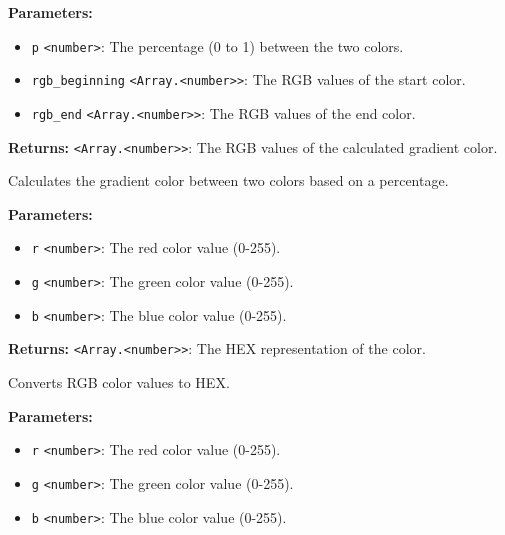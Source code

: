 \documentclass[12pt,a4paper]{article}
\begin{document}
\vspace{5mm}
\noindent {}


\noindent \textbf{Parameters:}
\begin{itemize}
  \item \texttt{p} \texttt{<number>}: The percentage (0 to 1) between the two colors.
  \item \texttt{rgb\_beginning} \texttt{<Array.<number>>}: The RGB values of the start color.
  \item \texttt{rgb\_end} \texttt{<Array.<number>>}: The RGB values of the end color.
\end{itemize}

\noindent \textbf{Returns:} \texttt{<Array.<number>>}: The RGB values of the calculated gradient color.

\noindent Calculates the gradient color between two colors based on a percentage.

\vspace{5mm}
\noindent {}


\noindent \textbf{Parameters:}
\begin{itemize}
  \item \texttt{r} \texttt{<number>}: The red color value (0-255).
  \item \texttt{g} \texttt{<number>}: The green color value (0-255).
  \item \texttt{b} \texttt{<number>}: The blue color value (0-255).
\end{itemize}

\noindent \textbf{Returns:} \texttt{<Array.<number>>}: The HEX representation of the color.

\noindent Converts RGB color values to HEX.

\vspace{5mm}
\noindent {}


\noindent \textbf{Parameters:}
\begin{itemize}
  \item \texttt{r} \texttt{<number>}: The red color value (0-255).
  \item \texttt{g} \texttt{<number>}: The green color value (0-255).
  \item \texttt{b} \texttt{<number>}: The blue color value (0-255).
\end{itemize}
\end{document}
